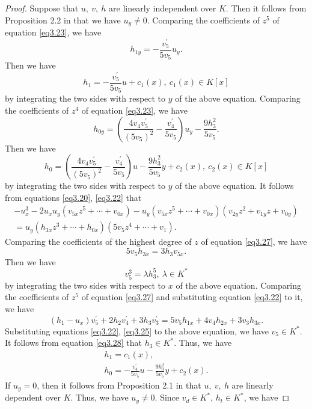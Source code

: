 \documentclass[12pt, twoside, leqno]{article}
\theoremstyle{definition}
\numberwithin{equation}{section}
\begin{document}
\begin{proof}
Suppose that $u,~v,~h$ are linearly independent over $K$. Then it follows from Proposition 2.2 in \cite{13} that we have $u_y\neq 0$. Comparing the coefficients of $z^5$ of equation \eqref{eq3.23}, we have
$$h_{1y}=-\frac{v_5^{'}}{5v_5}u_y.$$
Then we have
\begin{equation}\label{eq3.25}
h_1=-\frac{v_5^{'}}{5v_5}u+c_1(x),~c_1(x)\in K[x]
\end{equation}
by integrating the two sides with respect to $y$ of the above equation. Comparing the coefficients of $z^4$ of equation \eqref{eq3.23}, we have
$$h_{0y}=\left(\frac{4v_4v_5^{'}}{(5v_5)^2}-\frac{v_4^{'}}{5v_5}\right)u_y-\frac{9h_3^2}{5v_5}.$$
Then we have
\begin{equation}\label{eq3.26}
h_0=\left(\frac{4v_4v_5^{'}}{(5v_5)^2}-\frac{v_4^{'}}{5v_5}\right)u-\frac{9h_3^2}{5v_5}y+c_2(x),~c_2(x)\in K[x]
\end{equation}
by integrating the two sides with respect to $y$ of the above equation. It follows from equations \eqref{eq3.20}, \eqref{eq3.22} that
\begin{equation}\label{eq3.27}
\begin{split}
-u_{x}^{3}-2u_{x}u_{y}\left(v_{5x}z^{5}+\cdots+v_{0x}\right)-u_{y}\left(v_{5x}z^{5}+\cdots+v_{0x}\right) \left( v_{2y}z^{2}+v_{1y}z+v_{0y}\right)\\
	=u_{y}\left( h_{3x}z^{3}+\cdots+h_{0x}\right) \left( 5v_{5}z^{4}+\cdots+v_{1}\right).
\end{split}
\end{equation}
Comparing the coefficients of the highest degree of $z$ of equation \eqref{eq3.27}, we have
$$5v_5h_{3x}=3h_3v_{5x}.$$
Then we have
\begin{equation}\label{eq3.28}
v_5^3=\lambda h_3^5,~\lambda\in K^*
\end{equation}
by integrating the two sides with respect to $x$ of the above equation. Comparing the coefficients of $z^5$ of equation \eqref{eq3.27} and substituting equation \eqref{eq3.22} to it, we have
$$(h_1-u_x)v_5^{'}+2h_2v_4^{'}+3h_3v_3^{'}=5v_5h_{1x}+4v_4h_{2x}+3v_3h_{3x}.$$
Substituting equations \eqref{eq3.22}, \eqref{eq3.25} to the above equation, we have $v_5\in K^*$. It follows from equation \eqref{eq3.28} that $h_3\in K^*$. Thus, we have
\begin{eqnarray}
h_1=c_1(x),\label{eq3.29}\\
h_0=-\frac{v_4^{'}}{5v_5}u-\frac{9h_3^2}{5v_5}y+c_2(x).\label{eq3.30}
\end{eqnarray}
If $u_y=0$, then it follows from Proposition 2.1 in \cite{13} that $u,~v,~h$ are linearly dependent over $K$. Thus, we have $u_y\neq 0$. Since $v_d\in K^*$, $h_t\in K^*$, we have

\end{proof}
\end{document}
